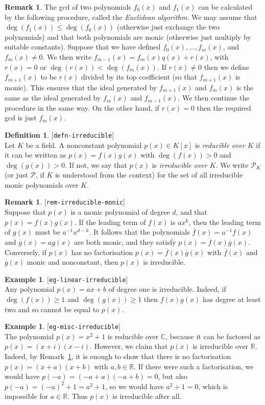 \documentclass{amsart}
\newcommand{\lbl}[1]{\label{#1}\textup{[\texttt{#1}]}\ \\}
\newcommand{\lbl}{\label}
\newcommand{\R}         {{\mathbb{R}}}
\newcommand{\C}         {{\mathbb{C}}}
\newcommand{\CP}        {{\mathcal{P}}}
\newcommand{\ov}[1]     {\overline{#1}}
\renewcommand{\:}{\colon}
\theoremstyle{definition}
\newtheorem{remark}[theorem]{Remark}
\newtheorem{definition}[theorem]{Definition}
\newtheorem{example}[theorem]{Example}
\begin{document}
\begin{remark}\label{rem-euclid-algo}
 The gcd of two polynomials $f_0(x)$ and $f_1(x)$ can be calculated by
 the following procedure, called the \emph{Euclidean algorithm}.  We
 may assume that $\deg(f_1(x))\leq\deg(f_0(x))$ (otherwise just
 exchange the two polynomials) and that both polynomials are monic
 (otherwise just multiply by suitable constants).  Suppose that we
 have defined $f_0(x),\dotsc,f_m(x)$, and $f_m(x)\neq 0$.  We then
 write $f_{m-1}(x)=f_m(x)q(x)+r(x)$, with $r(x)=0$ or
 $\deg(r(x))<\deg(f_m(x))$.  If $r(x)\neq 0$ then we define
 $f_{m+1}(x)$ to be $r(x)$ divided by its top coefficient (so that
 $f_{m+1}(x)$ is monic).  This ensures that the ideal generated by
 $f_{m+1}(x)$ and $f_m(x)$ is the same as the ideal generated by
 $f_m(x)$ and $f_{m-1}(x)$.  We then continue the procedure in the
 same way.  On the other hand, if $r(x)=0$ then the required gcd is
 just $f_m(x)$.
\end{remark}

\begin{definition}\lbl{defn-irreducible}
 Let $K$ be a field.  A nonconstant polynomial $p(x)\in K[x]$ is
 \emph{reducible over $K$} if it can be written as
 $p(x)=f(x)g(x)$ with $\deg(f(x))>0$ and $\deg(g(x))>0$.  If not, we
 say that $p(x)$ is \emph{irreducible over $K$}.  We write
 $\CP_K$ (or just $\CP$, if $K$ is understood from the context) for
 the set of all irreducible monic polynomials over $K$.
\end{definition}
\begin{remark}\lbl{rem-irreducible-monic}
 Suppose that $p(x)$ is a monic polynomial of degree $d$, and that
 $p(x)=f(x)g(x)$.  If the leading term of $f(x)$ is $ax^k$, then the
 leading term of $g(x)$ must be $a^{-1}x^{d-k}$.  It follows that the
 polynomials $\ov{f}(x)=a^{-1}f(x)$ and $\ov{g}(x)=ag(x)$ are both
 monic, and they satisfy $p(x)=\ov{f}(x)\ov{g}(x)$.  Conversely, if
 $p(x)$ has no factorisation $p(x)=\ov{f}(x)\ov{g}(x)$ with
 $\ov{f}(x)$ and $\ov{g}(x)$ monic and nonconstant, then $p(x)$ is
 irreducible. 
\end{remark}

\begin{example}\lbl{eg-linear-irreducible}
 Any polynomial $p(x)=ax+b$ of degree one is irreducible.  Indeed, if
 $\deg(f(x))\geq 1$ and $\deg(g(x))\geq 1$ then $f(x)g(x)$ has degree
 at least two and so cannot be equal to $p(x)$.
\end{example}

\begin{example}\lbl{eg-misc-irreducible}
 The polynomial $p(x)=x^2+1$ is reducible over $\C$, because it can be
 factored as $p(x)=(x+i)(x-i)$.  However, we claim that $p(x)$ is
 irreducible over $\R$.  Indeed, by
 Remark~\ref{rem-irreducible-monic}, it is enough to show that there
 is no factorisation $p(x)=(x+a)(x+b)$ with $a,b\in\R$.  If there
 were such a factorisation, we would have $p(-a)=(-a+a)(-a+b)=0$, but
 also $p(-a)=(-a)^2+1=a^2+1$, so we would have $a^2+1=0$, which is
 impossible for $a\in\R$.  Thus $p(x)$ is irreducible after all.
\end{example}
\end{document}
